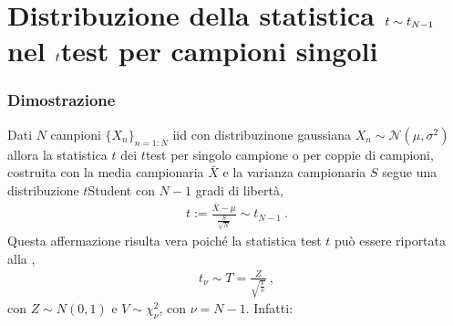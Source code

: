 \documentclass[letterpaper,10pt,italian]{jupyterBook}
\begin{document}
\sphinxAtStartPar
{}




\section{Distribuzione della statistica \protect\(t \sim t_{N-1}\protect\) nel \protect\(t\protect\)\sphinxhyphen{}test per campioni singoli}
\label{\detokenize{ch/proofs:distribuzione-della-statistica-t-sim-t-n-1-nel-t-test-per-campioni-singoli}}\label{\detokenize{ch/proofs:proof-t-test-gaussian}}\subsubsection*{Dimostrazione}

\sphinxAtStartPar
Dati \(N\) campioni \(\{ X_n \}_{n=1:N}\) iid con distribuzinone gaussiana \(X_n \sim \mathscr{N}(\mu, \sigma^2)\) allora la statistica \(t\) dei \(t\)\sphinxhyphen{}test per singolo campione o per coppie di campioni, costruita con la media campionaria \(\bar{X}\) e la varianza campionaria \(S\) segue una distribuzione \(t\)\sphinxhyphen{}Student con \(N-1\) gradi di libertà,
\begin{equation*}
\begin{split}t:= \frac{\bar{X}-\mu}{\frac{S}{\sqrt{N}}} \sim t_{N-1} \ .\end{split}
\end{equation*}
\sphinxAtStartPar
Questa affermazione risulta vera poiché la statistica test \(t\) può essere riportata alla ,
\begin{equation*}
\begin{split}t_{\nu} \sim T = \frac{Z}{\sqrt{\frac{V}{\nu}}} \ ,\end{split}
\end{equation*}
\sphinxAtStartPar
con \(Z \sim N(0,1)\) e \(V \sim \chi^2_{\nu}\), con \(\nu = N-1\). Infatti:
\end{document}

